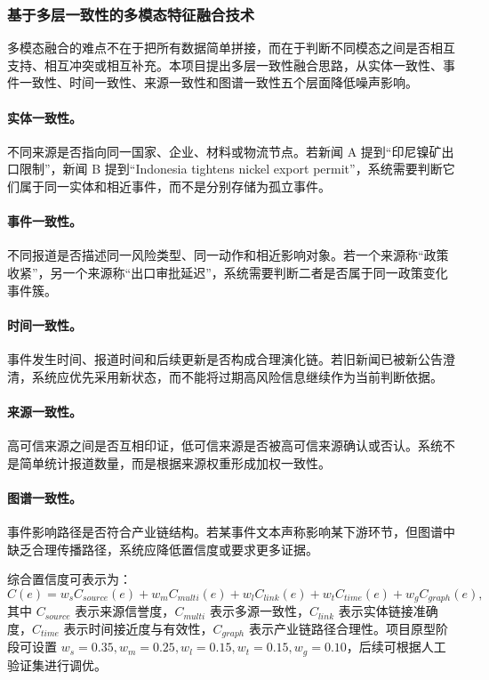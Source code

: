 ﻿\documentclass[12pt,a4paper]{article}
\begin{document}
\subsubsection{基于多层一致性的多模态特征融合技术}

多模态融合的难点不在于把所有数据简单拼接，而在于判断不同模态之间是否相互支持、相互冲突或相互补充。本项目提出多层一致性融合思路，从实体一致性、事件一致性、时间一致性、来源一致性和图谱一致性五个层面降低噪声影响。

\paragraph{实体一致性。}不同来源是否指向同一国家、企业、材料或物流节点。若新闻 A 提到“印尼镍矿出口限制”，新闻 B 提到“Indonesia tightens nickel export permit”，系统需要判断它们属于同一实体和相近事件，而不是分别存储为孤立事件。

\paragraph{事件一致性。}不同报道是否描述同一风险类型、同一动作和相近影响对象。若一个来源称“政策收紧”，另一个来源称“出口审批延迟”，系统需要判断二者是否属于同一政策变化事件簇。

\paragraph{时间一致性。}事件发生时间、报道时间和后续更新是否构成合理演化链。若旧新闻已被新公告澄清，系统应优先采用新状态，而不能将过期高风险信息继续作为当前判断依据。

\paragraph{来源一致性。}高可信来源之间是否互相印证，低可信来源是否被高可信来源确认或否认。系统不是简单统计报道数量，而是根据来源权重形成加权一致性。

\paragraph{图谱一致性。}事件影响路径是否符合产业链结构。若某事件文本声称影响某下游环节，但图谱中缺乏合理传播路径，系统应降低置信度或要求更多证据。

综合置信度可表示为：
\begin{equation}
C(e)=w_s C_{source}(e)+w_m C_{multi}(e)+w_l C_{link}(e)+w_t C_{time}(e)+w_g C_{graph}(e),
\end{equation}
其中 $C_{source}$ 表示来源信誉度，$C_{multi}$ 表示多源一致性，$C_{link}$ 表示实体链接准确度，$C_{time}$ 表示时间接近度与有效性，$C_{graph}$ 表示产业链路径合理性。项目原型阶段可设置 $w_s=0.35,w_m=0.25,w_l=0.15,w_t=0.15,w_g=0.10$，后续可根据人工验证集进行调优。
\end{document}

